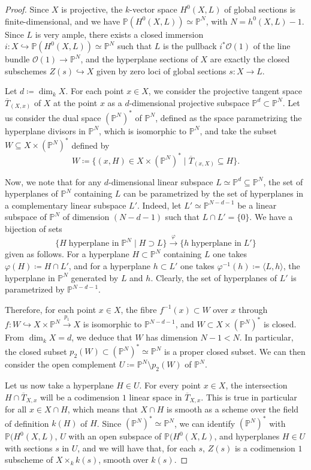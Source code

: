 \documentclass[10pt]{amsart}
\theoremstyle{definition}
\theoremstyle{plain}
\numberwithin{equation}{section}
\newcommand{\0}{\emptyset}
\renewcommand{\P}{{\mathbb P}}
\renewcommand{\dim}{{\operatorname{dim}}}
\begin{document}
\begin{proof}
    Since $X$ is projective, the $k$-vector space $H^0(X,L)$ of global sections is finite-dimensional, and we have $\P(H^0(X,L))\simeq \P^N$, with $N=h^0(X,L)-1$. Since $L$ is very ample, there exists a closed immersion $i:X \hookrightarrow \P(H^0(X,L))\simeq \P^N$ such that $L$ is the pullback $i^*\mathcal{O}(1)$ of the line bundle $\mathcal{O}(1)\to \P^N$, and the hyperplane sections of $X$ are exactly the closed subschemes $Z(s)\hookrightarrow X$ given by zero loci of global sections $s:X \to L$. 

    Let $d\coloneqq \dim_k X$. For each point $x \in X$, we consider the projective tangent space $\overline{T}_{(X,x)}$ of $X$ at the point $x$ as a $d$-dimensional projective subspace $\P^d \subset \P^N$. Let us consider the dual space $(\P^N)^*$ of $\P^N$, defined as the space parametrizing the hyperplane divisors in $\P^N$, which is isomorphic to $\P^N$, and take the subset $W \subseteq X \times (\P^N)^*$ defined by
    $$W \coloneqq \{(x,H) \in X \times (\P^N)^* \mid \overline{T}_{(x,X)}\subseteq H \}.$$

    Now, we note that for any $d$-dimensional linear subspace $L\simeq \P^d \subseteq \P^N$, the set of hyperplanes of $\P^N$ containing $L$ can be parametrized by the set of hyperplanes in a complementary linear subspace $L'$. Indeed, let $L'\simeq \P^{N-d-1}$ be a linear subspace of $\P^N$ of dimension $(N-d-1)$ such that $L \cap L'=\{0\}$. We have a bijection of sets
    $$\{H \; \text{hyperplane in} \; \P^N \mid H \supset L \} \xrightarrow{\varphi} \{h \; \text{hyperplane in} \; L'\}$$
    given as follows. For a hyperplane $H \subset \P^N$ containing $L$ one takes $\varphi(H) \coloneqq H \cap L'$, and for a hyperplane $h \subset L'$ one takes $\varphi^{-1}(h) \coloneqq \langle L,h \rangle$, the hyperplane in $\P^N$ generated by $L$ and $h$. Clearly, the set of hyperplanes of $L'$ is parametrized by $\P^{N-d-1}$.

    Therefore, for each point $x \in X$, the fibre $f^{-1}(x) \subset W$ over $x$ through $f:W \hookrightarrow X \times \P^N \xrightarrow{p_1} X$ is isomorphic to $\P^{N-d-1}$, and $W \subset X \times (\P^N)^*$ is closed. From $\dim_kX=d$, we deduce that $W$ has dimension $N-1<N$. In particular, the closed subset $p_2(W)\subset (\P^N)^*\simeq \P^N$ is a proper closed subset. We can then consider the open complement $U \coloneqq \P^N \setminus p_2(W)$ of $\P^N$. 
    
    Let us now take a hyperplane $H \in U$. For every point $x \in X$, the intersection $H \cap \overline{T}_{X,x}$ will be a codimension $1$ linear space in $\overline{T}_{X,x}$. This is true in particular for all $x \in X \cap H$, which means that $X \cap H$ is smooth as a scheme over the field of definition $k(H)$ of $H$. Since $(\P^N)^*\simeq \P^N$, we can identify $(\P^N)^*$ with $\P(H^0(X,L)$, $U$ with an open subspace of $\P(H^0(X,L)$, and hyperplanes $H\in U$ with sections $s$ in $U$, and we will have that, for each $s$, $Z(s)$ is a codimension $1$ subscheme of $X \times_k k(s)$, smooth over $k(s)$.
\end{proof}
\end{document}
